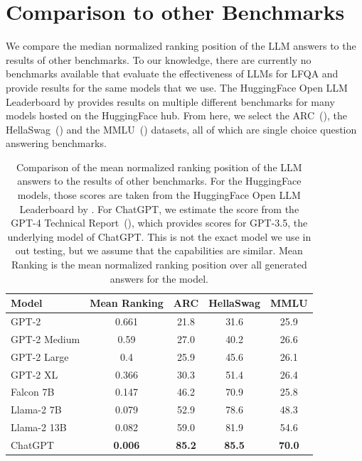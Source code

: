 \section{Comparison to other Benchmarks}\label{sec:benchmark_comparison}
We compare the median normalized ranking position of the LLM answers to the results of other benchmarks.
To our knowledge, there are currently no benchmarks available that evaluate the effectiveness of LLMs for LFQA and provide results for the same models that we use.
The HuggingFace Open LLM Leaderboard by \cite{beeching:2023:Open} provides results on multiple different benchmarks for many models hosted on the HuggingFace hub.
From here, we select the ARC~(\cite{clark:2018:Think}), the HellaSwag~(\cite{zellers:2019:HellaSwag}) and the MMLU~(\cite{hendrycks:2020:Measuring}) datasets, all of which are single choice question answering benchmarks.
\begin{table}[tb]
    \centering
    \begin{tabularx}{\textwidth}{lcccc}
    \hline
    \textbf{Model} & \textbf{Mean Ranking} & \textbf{ARC}  & \textbf{HellaSwag} & \textbf{MMLU} \\\hline
    GPT-2          & 0.661                             & 21.8          & 31.6               & 25.9          \\
    GPT-2 Medium   & 0.59                              & 27.0          & 40.2               & 26.6          \\
    GPT-2 Large    & 0.4                               & 25.9          & 45.6               & 26.1          \\
    GPT-2 XL       & 0.366                             & 30.3          & 51.4               & 26.4          \\
    Falcon 7B      & 0.147                             & 46.2          & 70.9               & 25.8          \\
    Llama-2 7B     & 0.079                             & 52.9          & 78.6               & 48.3          \\
    Llama-2 13B    & 0.082                             & 59.0          & 81.9               & 54.6          \\
    ChatGPT        & \textbf{0.006}                    & \textbf{85.2} & \textbf{85.5}      & \textbf{70.0} \\
    \hline
    \end{tabularx}
    \caption{Comparison of the mean normalized ranking position of the LLM answers to the results of other benchmarks.
    For the HuggingFace models, those scores are taken from the HuggingFace Open LLM Leaderboard by \cite{beeching:2023:Open}.
    For ChatGPT, we estimate the score from the GPT-4 Technical Report~(\cite{openai:2023:GPT}), which provides scores for GPT-3.5, the underlying model of ChatGPT.
    This is not the exact model we use in out testing, but we assume that the capabilities are similar.
    Mean Ranking is the mean normalized ranking position over all generated answers for the model.
    }
    \label{tab:benchmark_comparison}
\end{table}
